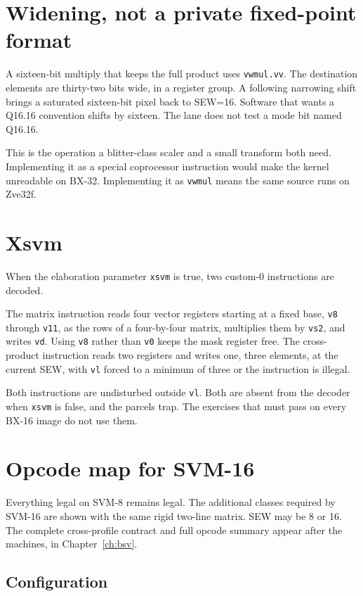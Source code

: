 \section{Widening, not a private fixed-point format}

A sixteen-bit multiply that keeps the full product uses \texttt{vwmul.vv}. The destination elements are thirty-two bits wide, in a register group. A following narrowing shift brings a saturated sixteen-bit pixel back to SEW=16. Software that wants a Q16.16 convention shifts by sixteen. The lane does not test a mode bit named Q16.16.

This is the operation a blitter-class scaler and a small transform both need. Implementing it as a special coprocessor instruction would make the kernel unreadable on BX-32. Implementing it as \texttt{vwmul} means the same source runs on Zve32f.

\section{Xsvm}

When the elaboration parameter \texttt{xsvm} is true, two custom-0 instructions are decoded.

The matrix instruction reads four vector registers starting at a fixed base, \texttt{v8} through \texttt{v11}, as the rows of a four-by-four matrix, multiplies them by \texttt{vs2}, and writes \texttt{vd}. Using \texttt{v8} rather than \texttt{v0} keeps the mask register free. The cross-product instruction reads two registers and writes one, three elements, at the current SEW, with \texttt{vl} forced to a minimum of three or the instruction is illegal.

Both instructions are undisturbed outside \texttt{vl}. Both are absent from the decoder when \texttt{xsvm} is false, and the parcels trap. The exercises that must pass on every BX-16 image do not use them.

\section{Opcode map for SVM-16}

Everything legal on SVM-8 remains legal. The additional classes required by SVM-16 are shown with the same rigid two-line matrix. SEW may be 8 or 16. The complete cross-profile contract and full opcode summary appear after the machines, in Chapter~\ref{ch:bsv}.

\subsection{Configuration}

